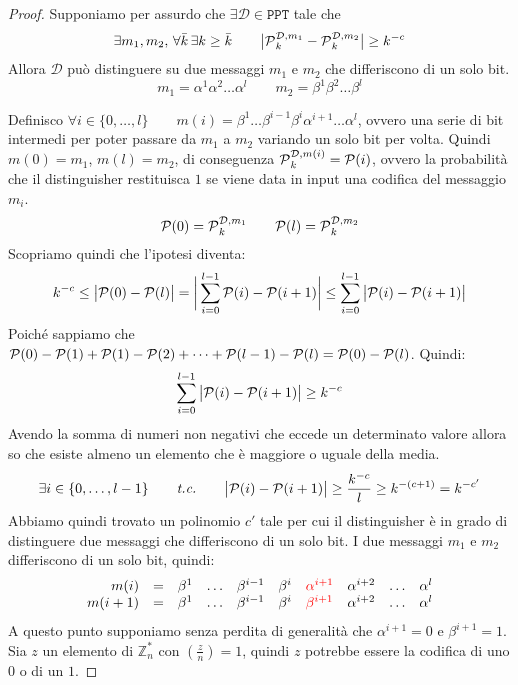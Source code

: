 \begin{proof}
  Supponiamo per assurdo che $\exists \mathcal{D} \in \texttt{PPT}$ tale che 
  \[
    \exists m_1, m_2, \,\forall \bar{k} \, \exists k \geq \bar{k} \qquad
    \big|\text{$\mathcal{P}$}_k^{\mathcal{D}, m_1} - \text{$\mathcal{P}$}_k^{\mathcal{D}, m_2}\big| \geq k^{-c}
  \]
   Allora $\mathcal{D}$ può distinguere su due messaggi $m_1$ e $m_2$ che differiscono di un solo bit.
   \begin{equation*}
    m_1 = \alpha^1 \alpha^2 \dots \alpha^l \qquad
    m_2 = \beta^1 \beta^2 \dots \beta^l 
   \end{equation*}

Definisco $\forall i \in \{0,\dots,l\} \qquad m(i) = \beta^1 \dots \beta^{i-1} \beta^i \alpha^{i+1} \dots \alpha^l$, 
ovvero una serie di bit intermedi per poter passare da $m_1$ a $m_2$ variando un solo bit per volta.
Quindi $m(0) = m_1$, $m(l) = m_2$, di conseguenza $\text{$\mathcal{P}$}_k^{\mathcal{D}, m(i)} = \text{$\mathcal{P}$}(i)$, ovvero la probabilità 
che il distinguisher restituisca $1$ se viene data in input una codifica del messaggio $m_i$.
  \[
    \text{$\mathcal{P}$}(0) = \text{$\mathcal{P}$}_k^{\mathcal{D}, m_1} \qquad \text{$\mathcal{P}$}(l) = \text{$\mathcal{P}$}_k^{\mathcal{D}, m_2}
  \]
Scopriamo quindi che l'ipotesi diventa:
\[
  k^{-c} \leq \big|\text{$\mathcal{P}$}(0) - \text{$\mathcal{P}$}(l)\big| = \bigg|\sum_{i=0}^{l - 1} \text{$\mathcal{P}$}(i) - \text{$\mathcal{P}$}(i+1)\bigg| 
  \leq \sum_{i=0}^{l - 1} \big|\text{$\mathcal{P}$}(i) - \text{$\mathcal{P}$}(i+1)\big|
\]
Poiché sappiamo che $\text{$\mathcal{P}$}(0) - \text{$\mathcal{P}$}(1) + \text{$\mathcal{P}$}(1) - \text{$\mathcal{P}$}(2) + \dots + \text{$\mathcal{P}$}(l-1) - \text{$\mathcal{P}$}(l) = \text{$\mathcal{P}$}(0) - \text{$\mathcal{P}$}(l)$. 
Quindi:
\[
  \sum_{i=0}^{l - 1} \big|\text{$\mathcal{P}$}(i) - \text{$\mathcal{P}$}(i+1)\big| \geq k^{-c}
\]
Avendo la somma di numeri non negativi che eccede un determinato valore allora
so che esiste almeno un elemento che è maggiore o uguale 
della media.
\[
  \exists i \in \{0,\dots,l-1\}\qquad \textit{t.c.} \qquad \big|\text{$\mathcal{P}$}(i) - \text{$\mathcal{P}$}(i+1)\big| \geq \frac{k^{-c}}{l} \geq k^{-(c+1)} = k^{-c'}
\]
Abbiamo quindi trovato un polinomio $c'$ tale per cui il distinguisher è in grado di distinguere due messaggi che differiscono
di un solo bit.
I due messaggi $m_1$ e $m_2$ differiscono di un solo bit, quindi:
\begin{align*}
  \begin{array}{r c lllllllll}
  m(i) & = & \beta^1 &\dots &\beta^{i-1} & \beta^i &\textcolor{red}{\alpha^{i+1}} & \alpha^{i+2} &\dots &\alpha^l \\
  m(i+1) & = & \beta^1 &\dots &\beta^{i-1} & \beta^i &\textcolor{red}{\beta^{i+1}} & \alpha^{i+2} &\dots &\alpha^l \\
  \end{array}
\end{align*}
A questo punto supponiamo senza perdita di generalità che $\alpha^{i+1} = 0$ e $\beta^{i+1} = 1$. Sia $z$ un 
elemento di $\mathbb{Z}_n^*$ con $\left( \frac{z}{n} \right) = 1$, quindi $z$ potrebbe essere la codifica di uno 
$0$ o di un $1$.


\end{proof}
